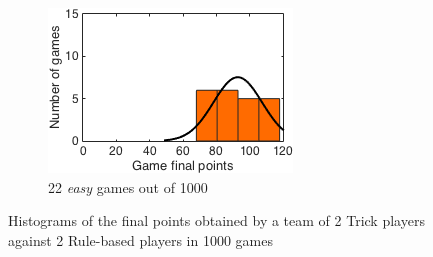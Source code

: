 \begin{figure}[h]
\begin{subfigure}[h]{0.32\textwidth}
                \includegraphics[width=\textwidth]{./img/appendix/histEeasy}
                \caption{22 \emph{easy} games out of 1000}
                \label{app:histEeasy}
        \end{subfigure}
        \caption[Histograms of the final points obtained in scenario (e) for \emph{hard}, \emph{medium} and \emph{easy} hands]{Histograms of the final points obtained by a team of 2 Trick players against 2 Rule-based players in 1000 games}
        \label{app:histogramsE}
\end{figure}


